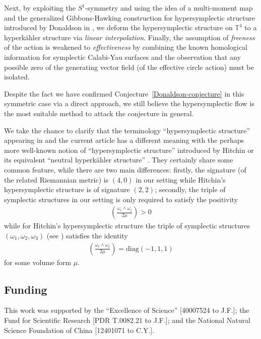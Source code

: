 \documentclass[11pt]{amsart}
\theoremstyle{plain}
\theoremstyle{definition}
\theoremstyle{plain}
\theoremstyle{definition}
\numberwithin{equation}{section}
\numberwithin{theorem}{section}
\begin{document}
Next, by exploiting the $S^1$-symmetry and using the idea of a multi-moment map and the generalized Gibbons-Hawking construction for hypersymplectic structure introduced by Donaldson in \cite{Don}, we deform the hypersymplectic structure on $\mathbb{T}^4$ to a hyperk\"ahler structure via \emph{linear interpolation}. Finally, the assumption of \emph{freeness} of the action is weakened to \emph{effectiveness} by combining the known homological information for symplectic Calabi-Yau surfaces \cite{Li} and the observation that any possible zero of the generating vector field (of the effective circle action) must be isolated. 


Despite the fact we have confirmed Conjecture~\ref{Donaldson-conjecture} in this symmetric case via a direct approach, we still believe the hypersymplectic flow is the most suitable method to attack the conjecture in general. 

We take the chance to clarify that the terminology ``hypersymplectic structure'' appearing in \cite{Don, FHY, FY, FY2, HWY} and the current article has a different meaning with the perhaps more well-known notion of ``hypersymplectic structure'' introduced by Hitchin \cite{Hitchin} or its equivalent ``neutral hyperk\"ahler structure'' \cite{Ka}. They certainly share some common feature, while there are two main differences: firstly, the signature (of the related Riemannian metric) is $(4,0)$ in our setting while Hitchin's hypersymplectic structure is of signature $(2,2)$; secondly, the triple of symplectic structures in our setting is only required to satisfy the positivity 
\begin{align*}
\left(\frac{\omega_i\wedge\omega_j}{2\mu}\right)>0
\end{align*}
 while for Hitchin's hypersymplectic structure the triple of symplectic structures $(\omega_1, \omega_2, \omega_3)$ (see \cite{DS}) satisfies the identity
 \begin{align*}
 \left(\frac{\omega_i\wedge\omega_j}{2\mu}\right)
 = 
 \text{diag}\left(-1,1,1\right) 
 \end{align*}
for some volume form $\mu$. 

\subsection*{Funding}
This work was supported by the “Excellence of Science” [40007524 to J.F.]; the Fund for Scientific Research [PDR T.0082.21 to J.F.]; and the National Natural Science Foundation of China [12401071 to C.Y.].
\end{document}
